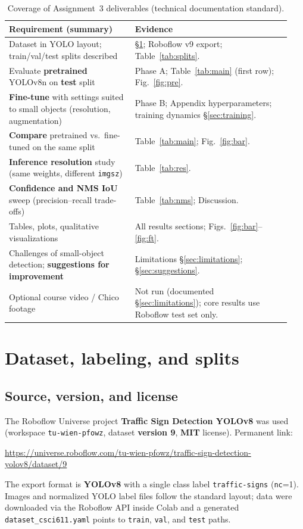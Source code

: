 \documentclass[11pt,a4paper]{article}
\begin{document}
\begin{table}[htbp]
  \centering
  \caption{Coverage of Assignment~3 deliverables (technical documentation standard).}
  \label{tab:compliance}
  \small
  \begin{tabular}{@{}p{0.42\linewidth}p{0.52\linewidth}@{}}
    \toprule
    \textbf{Requirement (summary)} & \textbf{Evidence} \\
    \midrule
    Dataset in YOLO layout; train/val/test splits described & \S\ref{sec:dataset}; Roboflow v9 export; Table~\ref{tab:splits}. \\
    Evaluate \textbf{pretrained} YOLOv8n on \textbf{test} split & Phase A; Table~\ref{tab:main} (first row); Fig.~\ref{fig:pre}. \\
    \textbf{Fine-tune} with settings suited to small objects (resolution, augmentation) & Phase B; Appendix hyperparameters; training dynamics \S\ref{sec:training}. \\
    \textbf{Compare} pretrained vs.\ fine-tuned on the same split & Table~\ref{tab:main}; Fig.~\ref{fig:bar}. \\
    \textbf{Inference resolution} study (same weights, different \texttt{imgsz}) & Table~\ref{tab:res}. \\
    \textbf{Confidence and NMS IoU} sweep (precision--recall trade-offs) & Table~\ref{tab:nms}; Discussion. \\
    Tables, plots, qualitative visualizations & All results sections; Figs.~\ref{fig:bar}--\ref{fig:ft}. \\
    Challenges of small-object detection; \textbf{suggestions for improvement} & Limitations \S\ref{sec:limitations}; \S\ref{sec:suggestions}. \\
    Optional course video / Chico footage & Not run (documented \S\ref{sec:limitations}); core results use Roboflow test set only. \\
    \bottomrule
  \end{tabular}
\end{table}

\section{Dataset, labeling, and splits}
\label{sec:dataset}

\subsection{Source, version, and license}
The Roboflow Universe project \textbf{Traffic Sign Detection YOLOv8} was used (workspace \texttt{tu-wien-pfowz}, dataset \textbf{version 9}, \textbf{MIT} license). Permanent link:
\begin{center}
\url{https://universe.roboflow.com/tu-wien-pfowz/traffic-sign-detection-yolov8/dataset/9}
\end{center}
The export format is \textbf{YOLOv8} with a single class label \texttt{traffic-signs} (\texttt{nc}=1). Images and normalized YOLO label files follow the standard layout; data were downloaded via the Roboflow API inside Colab and a generated \texttt{dataset\_csci611.yaml} points to \texttt{train}, \texttt{val}, and \texttt{test} paths.
\end{document}
